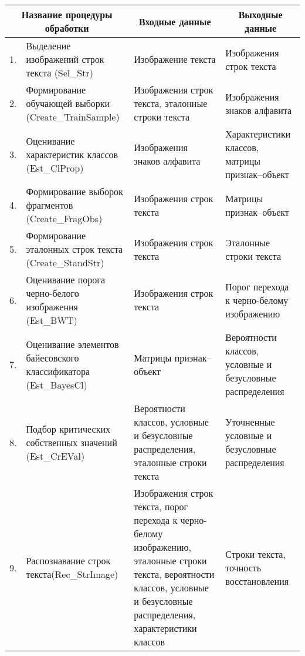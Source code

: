 \begin{table*}\small %
\begin{center}
\vspace*{2ex}

\begin{tabular}{|cp{55mm}|p{45mm}|p{45mm}|}
\hline
\multicolumn{2}{|c|}{Название процедуры обработки }&\multicolumn{1}{c|}{Входные данные}&\multicolumn{1}{c|}{Выходные данные}\\
\hline
1.&Выделение изображений строк текста (Sel\_Str)&Изображение текста&Изображения строк текста\\
\hline
2.&Формирование обучающей выборки (Create\_TrainSample)&Изображения строк текста, эталонные строки 
текста&Изображения знаков алфавита\\
\hline
3.&Оценивание характеристик классов (Est\_ClProp)&Изображения знаков алфавита&Характеристики классов, 
мат\-ри\-цы признак--объект\\
\hline
4.&Формирование выборок фрагментов (Create\_FragObs)&Изображения строк текста&Матрицы признак--объект\\
\hline
5.&Формирование эталонных строк текста (Create\_StandStr)&Изображения строк текста&Эталонные строки текста\\
\hline
6.&Оценивание порога черно-белого изоб\-ра\-же\-ния (Est\_BWT)&Изображения строк текста&Порог перехода к черно-белому изображению\\
\hline
7.&Оценивание элементов байе\-сов\-ско\-го классификатора (Est\_BayesCl)&Матрицы признак--объект&Вероятности 
классов, условные и безусловные распределения\\
\hline
8.&Подбор критических собственных значений (Est\_CrEVal)&Вероятности классов, условные и безусловные 
распределения, эталонные строки текста&Уточненные условные и безусловные распределения\\
\hline
9.&Распознавание строк текста\newline (Rec\_StrImage)&Изображения строк текста, порог перехода к черно-белому 
изображению, эталонные строки текста, вероятности классов, условные и безусловные распределения, характеристики 
классов&Строки текста, точность восстановления\\
\hline
\end{tabular}
\end{center}
\end{table*}


